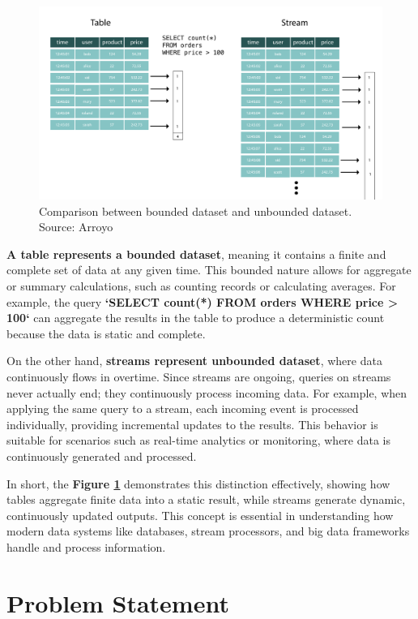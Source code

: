 \documentclass[12pt, a4paper]{article}
\begin{document}
\begin{figure}[H]
    \centering
    \includegraphics[width=\textwidth]{Images/unbounded-data.png}
    \vspace{1em}
    \caption{Comparison between bounded dataset and unbounded dataset. Source: Arroyo}
    \label{fig:comparison}
\end{figure}

\textbf{A table represents a bounded dataset}, meaning it contains a finite and
complete set of data at any given time. This bounded nature allows for aggregate
or summary calculations, such as counting records or calculating averages. For
example, the query \textbf{`SELECT count(*) FROM orders WHERE price > 100`} can
aggregate the results in the table to produce a deterministic count because the
data is static and complete.

On the other hand, \textbf{streams represent unbounded dataset}, where data
continuously flows in overtime. Since streams are ongoing, queries on streams
never actually end; they continuously process incoming data. For example, when
applying the same query to a stream, each incoming event is processed
individually, providing incremental updates to the results. This behavior is
suitable for scenarios such as real-time analytics or monitoring, where data is
continuously generated and processed.

In short, the \textbf{Figure \ref{fig:comparison}} demonstrates this distinction
effectively, showing how tables aggregate finite data into a static result,
while streams generate dynamic, continuously updated outputs. This concept is
essential in understanding how modern data systems like databases, stream
processors, and big data frameworks handle and process information.

\section{Problem Statement}
\end{document}
